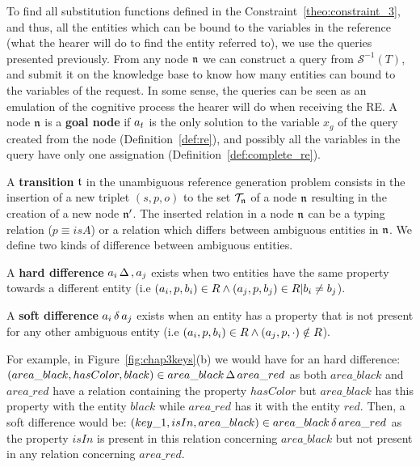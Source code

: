 \documentclass[a4paper,11pt,twoside]{StyleThese}
\begin{document}
To find all substitution functions defined in the Constraint~\ref{theo:constraint_3}, and thus, all the entities which can be bound to the variables in the reference (what the hearer will do to find the entity referred to), we use the \sparql{} queries presented previously. From any node $\mathfrak{n}$ we can construct a \sparql{} query from $\mathcal{S}^{-1}(T)$, and submit it on the knowledge base to know how many entities can bound to the variables of the request. In some sense, the \sparql{} queries can be seen as an emulation of the cognitive process the hearer will do when receiving the RE.
A node $\mathfrak{n}$ is a \textbf{goal node} if $a_t$ is the only solution to the variable $x_g$ of the \sparql{} query created from the node (Definition~\ref{def:re}), and possibly all the variables in the \sparql{} query have only one assignation (Definition~\ref{def:complete_re}).

A \textbf{transition} $\mathfrak{t}$ in the unambiguous reference generation problem consists in the insertion of a new triplet $(s, p, o)$ to the set $\mathcal{T}_{\mathfrak{n}}$ of a node $\mathfrak{n}$ resulting in the creation of a new node $\mathfrak{n}'$. The inserted relation in a node $\mathfrak{n}$ can be a typing relation ($p \equiv isA$) or a relation which differs between ambiguous entities in $\mathfrak{n}$. 
We define two kinds of difference between ambiguous entities.
\begin{definition}
A \textbf{hard difference} $a_i \,\Delta\,, a_j$ exists when two entities have the same property towards a different entity (i.e $(a_i, p, b_i) \in R \land (a_j, p, b_j) \in R | b_i \neq b_j$).
\end{definition}

\begin{definition}
A \textbf{soft difference} $a_i \,\delta\, a_j$ exists when an entity has a property that is not present for any other ambiguous entity (i.e $(a_i, p, b_i) \in R \land (a_j, p, \cdot) \notin R$).
\end{definition}

For example, in Figure~\ref{fig:chap3keys}(b) we would have for an hard difference: $(area\_black, hasColor, black) \in area\_black \,\Delta\, area\_red$ as both $area\_black$ and $area\_red$ have a relation containing the property $hasColor$ but $area\_black$ has this property with the entity $black$ while $area\_red$ has it with the entity $red$. Then, a soft difference would be: $(key\_1, isIn, area\_black) \in area\_black \,\delta\, area\_red$ as the property $isIn$ is present in this relation concerning $area\_black$ but not present in any relation concerning $area\_red$.
\end{document}
